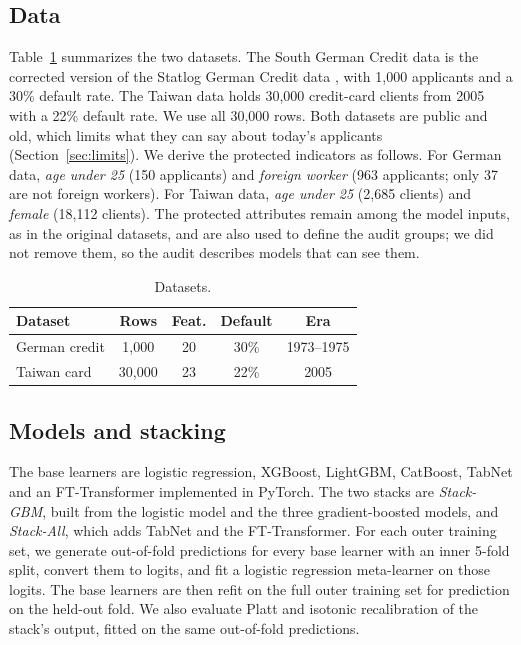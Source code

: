 \documentclass[conference,a4paper]{IEEEtran}
\begin{document}
\subsection{Data}
Table~\ref{tab:data} summarizes the two datasets. The South German Credit data \cite{r21} is the corrected version of the Statlog German Credit data \cite{r17,r22}, with 1{,}000 applicants and a 30\% default rate. The Taiwan data \cite{r31,r33} holds 30{,}000 credit-card clients from 2005 with a 22\% default rate. We use all 30{,}000 rows. Both datasets are public and old, which limits what they can say about today's applicants (Section~\ref{sec:limits}). We derive the protected indicators as follows. For German data, \emph{age under 25} (150 applicants) and \emph{foreign worker} (963 applicants; only 37 are not foreign workers). For Taiwan data, \emph{age under 25} (2{,}685 clients) and \emph{female} (18{,}112 clients). The protected attributes remain among the model inputs, as in the original datasets, and are also used to define the audit groups; we did not remove them, so the audit describes models that can see them.

\begin{table}[t]
\centering
\caption{Datasets.}
\label{tab:data}
\small
\setlength{\tabcolsep}{3pt}
\begin{tabular}{lcccc}
\toprule
Dataset & Rows & Feat. & Default & Era\\
\midrule
German credit & 1{,}000 & 20 & 30\% & 1973--1975\\
Taiwan card & 30{,}000 & 23 & 22\% & 2005\\
\bottomrule
\end{tabular}
\end{table}

\subsection{Models and stacking}
The base learners are logistic regression, XGBoost, LightGBM, CatBoost, TabNet and an FT-Transformer implemented in PyTorch. The two stacks are \emph{Stack-GBM}, built from the logistic model and the three gradient-boosted models, and \emph{Stack-All}, which adds TabNet and the FT-Transformer. For each outer training set, we generate out-of-fold predictions for every base learner with an inner 5-fold split, convert them to logits, and fit a logistic regression meta-learner on those logits. The base learners are then refit on the full outer training set for prediction on the held-out fold. We also evaluate Platt and isotonic recalibration of the stack's output, fitted on the same out-of-fold predictions.
\end{document}
